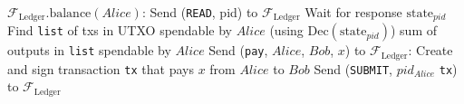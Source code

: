 \hrulefill
\ \\ 
  \label{alg:temp:formalfledger}
  \begin{algorithmic}[1]
    \State $\mathcal{F}_{\mathrm{Ledger}}\mathrm{.balance}\left(Alice\right)$:
    \State
    \State Send (\texttt{READ}, pid) to $\mathcal{F}_{\mathrm{Ledger}}$ 
    \State Wait for response $\mathrm{state}_{pid}$
    \State Find \texttt{list} of txs in UTXO spendable by $Alice$ (using
    $\mathrm{Dec}\left(\mathrm{state}_{pid}\right)$) 
    \State \Return sum of outputs in \texttt{list} spendable by $Alice$ 
    \State
    \State
    \State Send (\texttt{pay}, $Alice$, $Bob$, $x$) to $\mathcal{F}_{\mathrm{Ledger}}$:
    \State
    \State Create and sign transaction \texttt{tx} that pays $x$ from $Alice$ to $Bob$
    \State Send (\texttt{SUBMIT}, $pid_{Alice}$ \texttt{tx}) to
    $\mathcal{F}_{\mathrm{Ledger}}$
  \end{algorithmic}
\hrulefill
